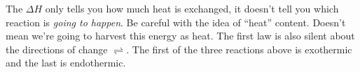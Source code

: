 \documentclass[12pt]{article}
\begin{document}
The $\Delta H$ only tells you how much heat is exchanged, it doesn't tell you which reaction is \emph{going to happen}.  Be careful with the idea of ``heat'' content.  Doesn't mean we're going to harvest this energy as heat.  The first law is also silent about the directions of change $\rightleftharpoons$.  The first of the three reactions above is exothermic and the last is endothermic.

%
%
%
\end{document}
